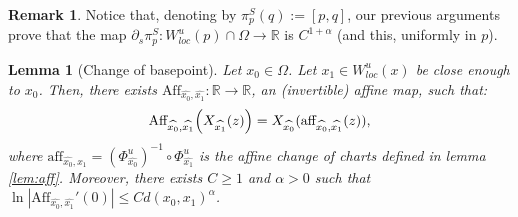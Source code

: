\documentclass[a4paper]{article}
\newtheorem{lemma}[theorem]{Lemma}
\theoremstyle{definition}
\newtheorem{remark}[example]{Remark}
\begin{document}
\begin{remark}\label{remark:holonomyregularity}
Notice that, denoting by $\pi_p^S(q) := [p,q]$, our previous arguments prove that the map $\partial_s \pi_p^S : W^u_{loc}(p) \cap \Omega \rightarrow \mathbb{R}$ is $C^{1+\alpha}$ (and this, uniformly in $p$).
\end{remark}






\begin{lemma}[Change of basepoint]\label{lem:Aff}
Let $x_0 \in \Omega$. Let $x_1 \in W^u_{loc}(x)$ be close enough to $x_0$. Then, there exists $\text{Aff}_{\widehat{x_0},\widehat{x_1}}:\mathbb{R} \rightarrow \mathbb{R}$, an (invertible) affine map, such that: 
$$ \text{Aff}_{{\widehat{x_0}},{\widehat{x_1}}}\Big{(} X_{{\widehat{x_1}}}(z) \Big{)}=  X_{\widehat{x_0}}(\text{aff}_{{\widehat{x_0}},{\widehat{x_1}}}(z)), $$
where $\text{aff}_{{\widehat{x_0}},{\widehat{x_1}}} = (\Phi_{{\widehat{x_0}}}^u)^{-1} \circ \Phi_{{\widehat{x_1}}}^{u}$ is the affine change of charts defined in lemma \ref{lem:aff}.
Moreover, there exists $C \geq 1$ and $\alpha>0$ such that $\ln |{\text{Aff}_{{\widehat{x_0}},{\widehat{x_1}}}}'(0)| \leq C d(x_0,x_1)^\alpha$.
\end{lemma}
\end{document}
